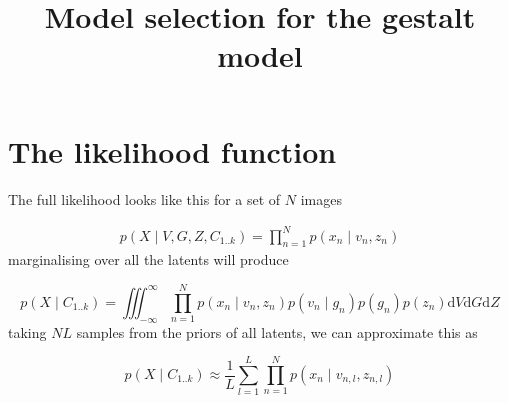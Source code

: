\documentclass{paper}
\begin{document}
\title{Model selection for the gestalt model}
\maketitle

\section{The likelihood function}

The full likelihood looks like this for a set of $N$ images

\begin{equation}
\begin{split}
p(X \mid V,G,Z,C_{1..k}) = \prod_{n=1}^N p(x_n \mid v_n,z_n)
\end{split}
\end{equation}
%
marginalising over all the latents will produce

\begin{equation}
p(X \mid C_{1..k}) = \iiint_{-\infty}^{\infty} \prod_{n=1}^N p(x_n \mid v_n,z_n) p(v_n \mid g_n) p(g_n) p(z_n) \mathrm{d}V\mathrm{d}G\mathrm{d}Z
\end{equation}
%
taking $NL$ samples from the priors of all latents, we can approximate this as

\begin{equation}
p(X \mid C_{1..k}) \approx \frac{1}{L} \sum_{l = 1}^{L} \prod_{n=1}^N p(x_n \mid v_{n,l},z_{n,l}) 
\end{equation}
\end{document}
